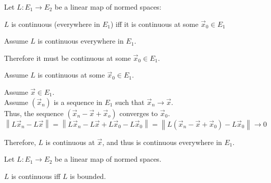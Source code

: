 \documentclass[letterpaper,12pt,fleqn]{article}
\newcommand{\vx}{\vec{x}}
\newcommand{\norm}[1]{\left\|#1\right\|}
\begin{document}
\begin{theorem}
  Let $L:E_1\to E_2$ be a linear map of normed spaces:

  \qquad$L$ is continuous (everywhere in $E_1$) iff it is continuous at some
  $\vx_0\in E_1$
\end{theorem}

\begin{theproof}
  \listbreak
  \begin{description}
  \item Assume $L$ is continuous everywhere in $E_1$.

    Therefore it must be continuous at some $\vx_0\in E_1$.

  \item Assume $L$ is continuous at some $\vx_0\in E_1$.

    Assume $\vx\in E_1$. \\
    Assume $(\vx_n)$ is a sequence in $E_1$ such that $\vx_n\to\vx$. \\
    Thus, the sequence $(\vx_n-\vx+\vx_o)$ converges to $\vx_0$. \\
    $\norm{L\vx_n-L\vx}=\norm{L\vx_n-L\vx+L\vx_0-L\vx_0}=
    \norm{L(\vx_n-\vx+\vx_0)-L\vx_0}\to0$

    Therefore, $L$ is continuous at $\vx$, and thus is continuous everywhere
    in $E_1$.
  \end{description}
\end{theproof}

\newpage

\begin{theorem}
  Let $L:E_1\to E_2$ be a linear map of normed spaces.

  \qquad$L$ is continuous iff $L$ is bounded.
\end{theorem}
\end{document}
